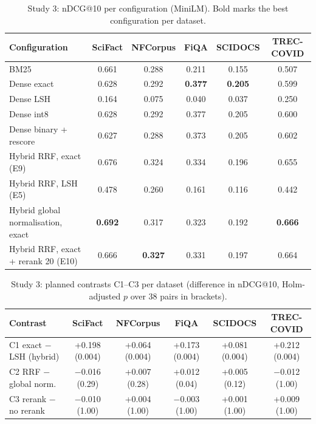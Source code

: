 \documentclass[11pt,a4paper]{article}
\makeatletter
\newcommand{\ndcg}{nDCG@10}
\makeatother
\begin{document}
\begin{table}[tbp]
\centering\small
\caption{Study 3: \ndcg{} per configuration (MiniLM). Bold marks the best configuration per dataset.}
\label{tab:beir}
\begin{tabular}{lccccc}
\toprule
Configuration & SciFact & NFCorpus & FiQA & SCIDOCS & TREC-COVID \\
\midrule
BM25 & 0.661 & 0.288 & 0.211 & 0.155 & 0.507 \\
Dense exact & 0.628 & 0.292 & \textbf{0.377} & \textbf{0.205} & 0.599 \\
Dense LSH & 0.164 & 0.075 & 0.040 & 0.037 & 0.250 \\
Dense int8 & 0.628 & 0.292 & 0.377 & 0.205 & 0.600 \\
Dense binary + rescore & 0.627 & 0.288 & 0.373 & 0.205 & 0.602 \\
\rowcolor{blue!6} Hybrid RRF, exact (E9) & 0.676 & 0.324 & 0.334 & 0.196 & 0.655 \\
Hybrid RRF, LSH (E5) & 0.478 & 0.260 & 0.161 & 0.116 & 0.442 \\
Hybrid global normalisation, exact & \textbf{0.692} & 0.317 & 0.323 & 0.192 & \textbf{0.666} \\
Hybrid RRF, exact + rerank 20 (E10) & 0.666 & \textbf{0.327} & 0.331 & 0.197 & 0.664 \\
\bottomrule
\end{tabular}
\end{table}

\begin{table}[tbp]
\centering\footnotesize\setlength{\tabcolsep}{4pt}
\caption{Study 3: planned contrasts C1--C3 per dataset (difference in \ndcg{}, Holm-adjusted $p$ over 38 pairs in brackets).}
\label{tab:beircontrasts}
\begin{tabular}{lccccc}
\toprule
Contrast & SciFact & NFCorpus & FiQA & SCIDOCS & TREC-COVID \\
\midrule
C1 exact $-$ LSH (hybrid) & +0.198 (0.004) & +0.064 (0.004) & +0.173 (0.004) & +0.081 (0.004) & +0.212 (0.004) \\
C2 RRF $-$ global norm. & $-$0.016 (0.29) & +0.007 (0.28) & +0.012 (0.04) & +0.005 (0.12) & $-$0.012 (1.00) \\
C3 rerank $-$ no rerank & $-$0.010 (1.00) & +0.004 (1.00) & $-$0.003 (1.00) & +0.001 (1.00) & +0.009 (1.00) \\
\bottomrule
\end{tabular}
\end{table}
\end{document}
